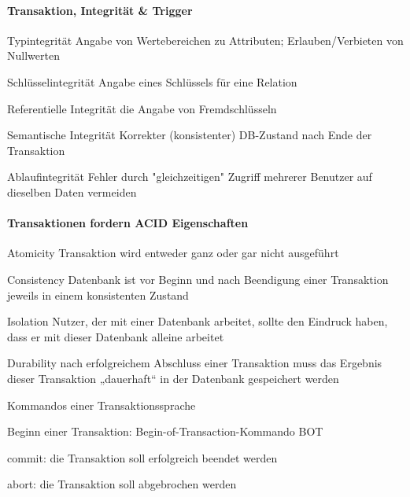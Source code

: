 \documentclass[a4paper]{article}
\begin{document}
\begin{multicols}{3}
    \paragraph{Transaktion, Integrität \& Trigger}
    \begin{description*}
        \item[Typintegrität] Angabe von Wertebereichen zu Attributen; Erlauben/Verbieten von Nullwerten
        \item[Schlüsselintegrität] Angabe eines Schlüssels für eine Relation
        \item[Referentielle Integrität] die Angabe von Fremdschlüsseln
        \item[Semantische Integrität] Korrekter (konsistenter) DB-Zustand nach Ende der Transaktion
        \item[Ablaufintegrität] Fehler durch "gleichzeitigen" Zugriff mehrerer Benutzer auf dieselben Daten vermeiden
    \end{description*}

    \paragraph{Transaktionen fordern ACID Eigenschaften}
    \begin{description*}
        \item[Atomicity] Transaktion wird entweder ganz oder gar nicht ausgeführt
        \item[Consistency] Datenbank ist vor Beginn und nach Beendigung einer Transaktion jeweils in einem konsistenten Zustand
        \item[Isolation] Nutzer, der mit einer Datenbank arbeitet, sollte den Eindruck haben, dass er mit dieser Datenbank alleine arbeitet
        \item[Durability] nach erfolgreichem Abschluss einer Transaktion muss das Ergebnis dieser Transaktion „dauerhaft“ in der Datenbank gespeichert werden
    \end{description*}

    Kommandos einer Transaktionssprache
    \begin{itemize*}
        \item Beginn einer Transaktion: Begin-of-Transaction-Kommando BOT
        \item commit: die Transaktion soll erfolgreich beendet werden
        \item abort: die Transaktion soll abgebrochen werden
    \end{itemize*}


\end{multicols}
\end{document}

